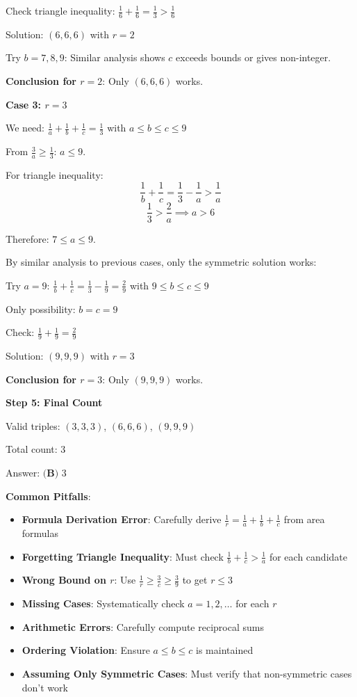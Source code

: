 \documentclass[12pt]{article}
\begin{document}
\begin{solutionbox}
Check triangle inequality: $\frac{1}{6} + \frac{1}{6} = \frac{1}{3} > \frac{1}{6}$ \checkmark

Solution: $(6, 6, 6)$ with $r = 2$ \checkmark

Try $b = 7, 8, 9$: Similar analysis shows $c$ exceeds bounds or gives non-integer.

\textbf{Conclusion for $r = 2$}: Only $(6, 6, 6)$ works.

\textbf{Case 3: $r = 3$}

We need: $\frac{1}{a} + \frac{1}{b} + \frac{1}{c} = \frac{1}{3}$ with $a \leq b \leq c \leq 9$

From $\frac{3}{a} \geq \frac{1}{3}$: $a \leq 9$.

For triangle inequality:
$$\frac{1}{b} + \frac{1}{c} = \frac{1}{3} - \frac{1}{a} > \frac{1}{a}$$
$$\frac{1}{3} > \frac{2}{a} \implies a > 6$$

Therefore: $7 \leq a \leq 9$.

By similar analysis to previous cases, only the symmetric solution works:

Try $a = 9$: $\frac{1}{b} + \frac{1}{c} = \frac{1}{3} - \frac{1}{9} = \frac{2}{9}$ with $9 \leq b \leq c \leq 9$

Only possibility: $b = c = 9$

Check: $\frac{1}{9} + \frac{1}{9} = \frac{2}{9}$ \checkmark

Solution: $(9, 9, 9)$ with $r = 3$ \checkmark

\textbf{Conclusion for $r = 3$}: Only $(9, 9, 9)$ works.

\textbf{Step 5: Final Count}

Valid triples: $(3, 3, 3)$, $(6, 6, 6)$, $(9, 9, 9)$

Total count: $\boxed{3}$

Answer: $\boxed{\textbf{(B) } 3}$

\end{solutionbox}

\begin{warning}
\textbf{Common Pitfalls}:
\begin{itemize}
    \item \textbf{Formula Derivation Error}: Carefully derive $\frac{1}{r} = \frac{1}{a} + \frac{1}{b} + \frac{1}{c}$ from area formulas
    \item \textbf{Forgetting Triangle Inequality}: Must check $\frac{1}{b} + \frac{1}{c} > \frac{1}{a}$ for each candidate
    \item \textbf{Wrong Bound on $r$}: Use $\frac{1}{r} \geq \frac{3}{c} \geq \frac{3}{9}$ to get $r \leq 3$
    \item \textbf{Missing Cases}: Systematically check $a = 1, 2, \ldots$ for each $r$
    \item \textbf{Arithmetic Errors}: Carefully compute reciprocal sums
    \item \textbf{Ordering Violation}: Ensure $a \leq b \leq c$ is maintained
    \item \textbf{Assuming Only Symmetric Cases}: Must verify that non-symmetric cases don't work
\end{itemize}
\end{warning}
\end{document}
